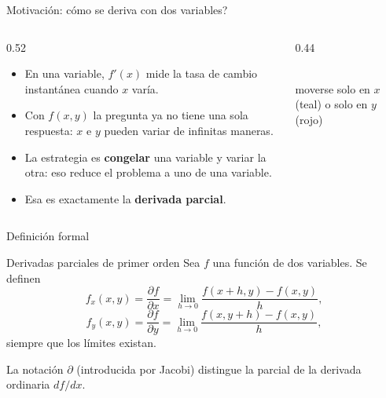 \documentclass[11pt,aspectratio=169]{beamer}
\begin{document}
\begin{frame}{Motivación: \textquestiondown{}cómo se deriva con dos variables?}
  \begin{columns}
    \begin{column}{0.52\textwidth}
      \begin{itemize}
        \item En una variable, $f'(x)$ mide la tasa de cambio instantánea cuando $x$ varía.
        \pause
        \item Con $f(x,y)$ la pregunta ya no tiene una sola respuesta: $x$ e $y$ pueden variar de infinitas maneras.
        \pause
        \item La estrategia es \textbf{congelar} una variable y variar la otra: eso reduce el problema a uno de una variable.
        \pause
        \item Esa es exactamente la \textbf{derivada parcial}.
      \end{itemize}
    \end{column}
    \begin{column}{0.44\textwidth}
      \centering
      \\[4pt]
      {\footnotesize\color{gray60} moverse solo en $x$ (teal) o solo en $y$ (rojo)}
    \end{column}
  \end{columns}
\end{frame}

\begin{frame}{Definición formal}
  \begin{block}{Derivadas parciales de primer orden}
    Sea $f$ una función de dos variables. Se definen
    \[
      f_x(x,y)=\frac{\partial f}{\partial x}=\lim_{h\to 0}\frac{f(x+h,y)-f(x,y)}{h},
    \]
    \[
      f_y(x,y)=\frac{\partial f}{\partial y}=\lim_{h\to 0}\frac{f(x,y+h)-f(x,y)}{h},
    \]
    siempre que los límites existan.
  \end{block}
  \pause
  \vspace{4pt}
  \begin{center}
  \small\color{gray60} La notación $\partial$ (introducida por Jacobi) distingue la parcial de la derivada ordinaria $df/dx$.
  \end{center}
\end{frame}
\end{document}

